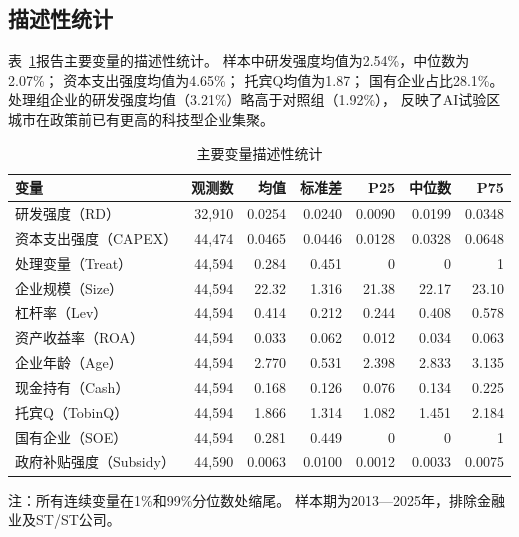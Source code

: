 \documentclass[12pt,hyperref,a4paper,UTF8]{ctexart}
\begin{document}
\subsection{描述性统计}



表~\ref{tab:desc}报告主要变量的描述性统计。
样本中研发强度均值为2.54\%，中位数为2.07\%；
资本支出强度均值为4.65\%；
托宾Q均值为1.87；
国有企业占比28.1\%。
处理组企业的研发强度均值（3.21\%）略高于对照组（1.92\%），
反映了AI试验区城市在政策前已有更高的科技型企业集聚。

\begin{table}[htbp]
\centering
\caption{主要变量描述性统计}
\label{tab:desc}
\begin{threeparttable}
\begin{tabular}{lrrrrrr}
\toprule
变量 & 观测数 & 均值 & 标准差 & P25 & 中位数 & P75 \\
\midrule
研发强度（RD） & 32,910 & 0.0254 & 0.0240 & 0.0090 & 0.0199 & 0.0348 \\
资本支出强度（CAPEX） & 44,474 & 0.0465 & 0.0446 & 0.0128 & 0.0328 & 0.0648 \\
处理变量（Treat） & 44,594 & 0.284 & 0.451 & 0 & 0 & 1 \\
企业规模（Size） & 44,594 & 22.32 & 1.316 & 21.38 & 22.17 & 23.10 \\
杠杆率（Lev） & 44,594 & 0.414 & 0.212 & 0.244 & 0.408 & 0.578 \\
资产收益率（ROA）& 44,594 & 0.033 & 0.062 & 0.012 & 0.034 & 0.063 \\
企业年龄（Age） & 44,594 & 2.770 & 0.531 & 2.398 & 2.833 & 3.135 \\
现金持有（Cash） & 44,594 & 0.168 & 0.126 & 0.076 & 0.134 & 0.225 \\
托宾Q（TobinQ）& 44,594 & 1.866 & 1.314 & 1.082 & 1.451 & 2.184 \\
国有企业（SOE） & 44,594 & 0.281 & 0.449 & 0 & 0 & 1 \\
政府补贴强度（Subsidy）& 44,590 & 0.0063 & 0.0100 & 0.0012 & 0.0033 & 0.0075 \\
\bottomrule
\end{tabular}
\begin{tablenotes}
\item 注：所有连续变量在1\%和99\%分位数处缩尾。
样本期为2013—2025年，排除金融业及ST/\*ST公司。
\end{tablenotes}
\end{threeparttable}
\end{table}
\end{document}
